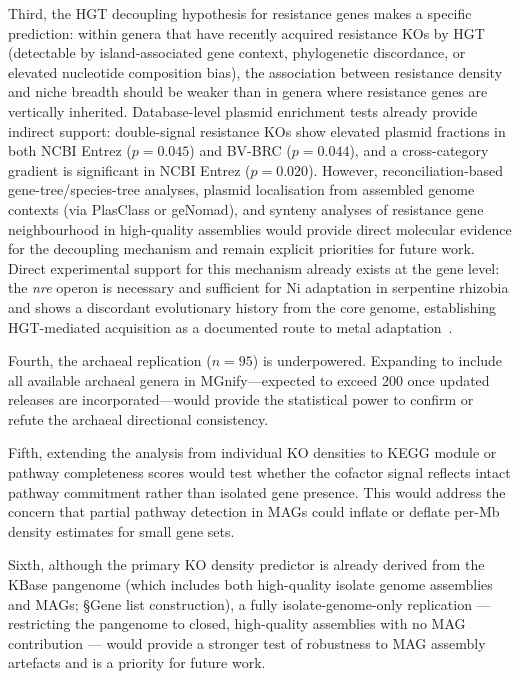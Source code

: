 \documentclass[times]{zHenriquesLab-StyleBioRxiv}
\begin{document}
Third, the HGT decoupling hypothesis for resistance genes makes a specific
prediction: within genera that have recently acquired resistance KOs by HGT
(detectable by island-associated gene context, phylogenetic discordance, or
elevated nucleotide composition bias), the association between resistance density
and niche breadth should be weaker than in genera where resistance genes are
vertically inherited. Database-level plasmid enrichment tests already provide
indirect support: double-signal resistance KOs show elevated plasmid fractions in
both NCBI Entrez ($p = 0.045$) and BV-BRC ($p = 0.044$), and a cross-category
gradient is significant in NCBI Entrez ($p = 0.020$). However, reconciliation-based
gene-tree/species-tree analyses, plasmid localisation from assembled genome contexts
(via PlasClass or geNomad), and synteny analyses of resistance gene neighbourhood
in high-quality assemblies would provide direct molecular evidence for the decoupling
mechanism and remain explicit priorities for future work. Direct experimental support
for this mechanism already exists at the gene level: the \textit{nre} operon is
necessary and sufficient for Ni adaptation in serpentine rhizobia and shows a
discordant evolutionary history from the core genome, establishing HGT-mediated
acquisition as a documented route to metal adaptation~\cite{kehlet2024}.

Fourth, the archaeal replication ($n = 95$) is underpowered. Expanding to
include all available archaeal genera in MGnify---expected to exceed 200 once
updated releases are incorporated---would provide the statistical power to confirm
or refute the archaeal directional consistency.

Fifth, extending the analysis from individual KO densities to KEGG module or
pathway completeness scores would test whether the cofactor signal reflects
intact pathway commitment rather than isolated gene presence. This would address
the concern that partial pathway detection in MAGs could inflate or deflate
per-Mb density estimates for small gene sets.

Sixth, although the primary KO density predictor is already derived from the
KBase pangenome (which includes both high-quality isolate genome assemblies and
MAGs; \S{}Gene list construction), a fully isolate-genome-only replication ---
restricting the pangenome to closed, high-quality assemblies with no MAG
contribution --- would provide a stronger test of robustness to MAG assembly
artefacts and is a priority for future work.

\end{document}
